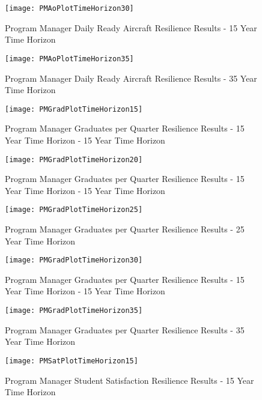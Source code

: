 \documentclass[preprint,12pt]{elsarticle}
\begin{document}
\begin{figure}[h]
  \centering\texttt{[image: PMAoPlotTimeHorizon30]}
  \caption{Program Manager Daily Ready Aircraft Resilience Results - 15 Year Time Horizon}
  \label{f:PMresultsAo30}
\end{figure}

\begin{figure}[h]
  \centering\texttt{[image: PMAoPlotTimeHorizon35]}
  \caption{Program Manager Daily Ready Aircraft Resilience Results - 35 Year Time Horizon}
  \label{f:PMresultsAo35}
\end{figure}


\begin{figure}[h]
  \centering\texttt{[image: PMGradPlotTimeHorizon15]}
  \caption{Program Manager Graduates per Quarter Resilience Results - 15 Year Time Horizon - 15 Year Time Horizon}
  \label{f:PMresultsGrad15}
\end{figure}

\begin{figure}[h]
  \centering\texttt{[image: PMGradPlotTimeHorizon20]}
  \caption{Program Manager Graduates per Quarter Resilience Results - 15 Year Time Horizon - 15 Year Time Horizon}
  \label{f:PMresultsGrad20}
\end{figure}


\begin{figure}[h]
  \centering\texttt{[image: PMGradPlotTimeHorizon25]}
  \caption{Program Manager Graduates per Quarter Resilience Results - 25 Year Time Horizon}
  \label{f:PMresultsGrad25}
\end{figure}

\begin{figure}[h]
  \centering\texttt{[image: PMGradPlotTimeHorizon30]}
  \caption{Program Manager Graduates per Quarter Resilience Results - 15 Year Time Horizon - 15 Year Time Horizon}
  \label{f:PMresultsGrad30}
\end{figure}


\begin{figure}[h]
  \centering\texttt{[image: PMGradPlotTimeHorizon35]}
  \caption{Program Manager Graduates per Quarter Resilience Results - 35 Year Time Horizon}
  \label{f:PMresultsGrad35}
\end{figure}

\begin{figure}[h]
  \centering\texttt{[image: PMSatPlotTimeHorizon15]}
  \caption{Program Manager Student Satisfaction Resilience Results - 15 Year Time Horizon}
  \label{f:PMresultsSat15}
\end{figure}
\end{document}

